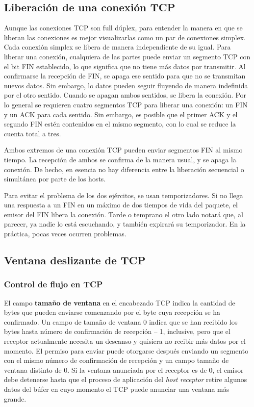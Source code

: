 \documentclass[10pt,a4paper]{report}
\begin{document}
\subsection{Liberación de una conexión TCP}

	\par Aunque las conexiones TCP son full dúplex, para entender la manera en que se liberan las conexiones es mejor visualizarlas como un par de conexiones simplex. Cada conexión simplex se libera de manera independiente de su igual. Para liberar una conexión, cualquiera de las partes puede enviar un segmento TCP con el bit FIN establecido, lo que significa que no tiene más datos por transmitir. Al confirmarse la recepción de FIN, se apaga ese sentido para que no se transmitan nuevos datos. Sin embargo, lo datos pueden seguir fluyendo de manera indefinida por el otro sentido. Cuando se apagan ambos sentidos, se libera la conexión. Por lo general se requieren cuatro segmentos TCP para liberar una conexión: un FIN y un ACK para cada sentido. Sin embargo, es posible que el primer ACK y el segundo FIN estén contenidos en el mismo segmento, con lo cual se reduce la cuenta total a tres.
	
	\par Ambos extremos de una conexión TCP pueden enviar segmentos FIN al mismo tiempo. La recepción de ambos se confirma de la manera usual, y se apaga la conexión. De hecho, en esencia no hay diferencia entre la liberación secuencial o simultánea por parte de los hosts.
	
	\par Para evitar el problema de los dos ejércitos, se usan temporizadores. Si no llega una respuesta a un FIN en un máximo de dos tiempos de vida del paquete, el emisor del FIN libera la conexión. Tarde o temprano el otro lado notará que, al parecer, ya nadie lo está escuchando, y también expirará su temporizador. En la práctica, pocas veces ocurren problemas.
	
\subsection{Ventana deslizante de TCP}

\subsubsection{Control de flujo en TCP}
	
	\par El campo \textbf{tamaño de ventana} en el encabezado TCP indica la cantidad de bytes que pueden enviarse comenzando por el byte cuya recepción se ha confirmado. Un campo de tamaño de ventana 0 indica que se han recibido los bytes hasta número de confirmación de recepción – 1, inclusive, pero que el receptor actualmente necesita un descanso y quisiera no recibir más datos por el momento. El permiso para enviar puede otorgarse después enviando un segmento con el mismo número de confirmación de recepción y un campo tamaño de ventana distinto de 0. Si la ventana anunciada por el receptor es de 0, el emisor debe detenerse hasta que el proceso de aplicación del \textit{host receptor} retire algunos datos del búfer en cuyo momento el TCP puede anunciar una ventana más grande.
\end{document}
